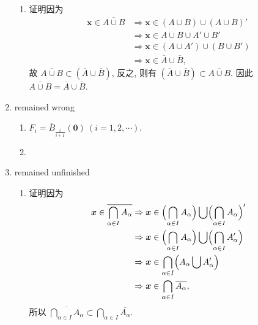 \documentclass[a4paper, 11pt]{ctexart}
\begin{document}
\begin{enumerate}
\begin{enumerate}[(1)]
            \item %
                {\heiti 证明}\quad 因为
                \begin{align*}
                    \boldsymbol{x} \in \overline{A \cup B} &\Rightarrow \boldsymbol{x} \in (A \cup B) \cup (A \cup B)' \\
                    &\Rightarrow \boldsymbol{x} \in A \cup B \cup A' \cup B' \\
                    &\Rightarrow \boldsymbol{x} \in (A \cup A') \cup (B \cup B') \\
                    &\Rightarrow \boldsymbol{x} \in \overline{A} \cup \overline{B},
                \end{align*}
                故 $\overline{A \cup B} \subset (\overline{A} \cup \overline{B})$, 反之, 则有 $(\overline{A} \cup \overline{B}) \subset \overline{A \cup B}$. 因此 $\overline{A \cup B} = \overline{A} \cup \overline{B}$.
        \end{enumerate}
    \item %
        {\color{red} remained wrong}
        \begin{enumerate}[(1)]
            \item %
                $\displaystyle{F_i = \overline{B}_{\frac{i}{i+1}}(\boldsymbol{0})\ (i = 1, 2, \cdots)}$.
            \item %
        \end{enumerate}
    \item %
        {\color{red} remained unfinished}
        \begin{enumerate}[(1)]
            \item %
                {\heiti 证明}\quad 因为
                \begin{align*}
                    \boldsymbol{x} \in \overline{\bigcap_{\alpha \in I}A_\alpha} &\Rightarrow \boldsymbol{x} \in \Bigl(\bigcap_{\alpha \in I}A_\alpha\Bigr) \bigcup \Bigl(\bigcap_{\alpha \in I}A_\alpha\Bigr)' \\
                    &\Rightarrow \boldsymbol{x} \in \Bigl(\bigcap_{\alpha \in I}A_\alpha\Bigr) \bigcup \Bigl(\bigcap_{\alpha \in I}A_\alpha'\Bigr) \\
                    &\Rightarrow \boldsymbol{x} \in \bigcap_{\alpha \in I}\Bigl(A_\alpha \bigcup A_\alpha'\Bigr) \\
                    &\Rightarrow \boldsymbol{x} \in \bigcap_{\alpha \in I}\overline{A_\alpha},
                \end{align*}
                所以 $\displaystyle{\overline{\bigcap_{\alpha \in I}A_\alpha} \subset \bigcap_{\alpha \in I}\overline{A_\alpha}}$.

\end{enumerate}
\end{enumerate}
\end{document}
